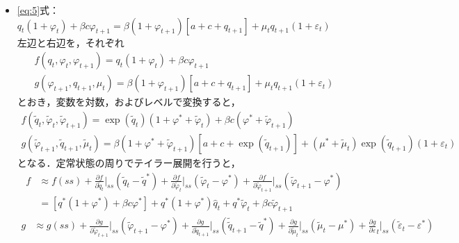 \documentclass[dvipdfmx]{jlreq}
\begin{document}
\begin{itemize}
  \item \eqref{eq:5}式：$q_t (1 + \varphi_t) + \beta c \varphi_{t+1} = \beta (1 + \varphi_{t+1})[a + c + q_{t+1}] + \mu_t q_{t+1} (1+\varepsilon_t)$ \\
    左辺と右辺を，それぞれ
    \begin{gather}
      f(q_t, \varphi_t, \varphi_{t+1}) = q_t (1 + \varphi_t) + \beta c \varphi_{t+1} \\
      g(\varphi_{t+1}, q_{t+1}, \mu_t) = \beta (1 + \varphi_{t+1})[a + c + q_{t+1}] + \mu_t q_{t+1} (1+\varepsilon_t)
    \end{gather}
    とおき，変数を対数，およびレベルで変換すると，
    \begin{gather}
      f(\widetilde{q}_t, \widetilde{\varphi}_t, \widetilde{\varphi}_{t+1}) = \exp(\widetilde{q}_t) (1 + \varphi^* + \widetilde{\varphi}_t) + \beta c (\varphi^* + \widetilde{\varphi}_{t+1}) \\
      g(\widetilde{\varphi}_{t+1}, \widetilde{q}_{t+1}, \widetilde{\mu}_t) = \beta(1 + \varphi^* + \widetilde{\varphi}_{t+1})[a + c + \exp(\widetilde{q}_{t+1})] + (\mu^* + \widetilde{\mu}_t) \exp(\widetilde{q}_{t+1}) (1+\varepsilon_t)
    \end{gather}
    となる．定常状態の周りでテイラー展開を行うと，
    \begin{equation}
      \begin{split}
        f &\approx f(ss) + \frac{\partial f}{\partial \widetilde{q}_t} \bigg|_{ss} (\widetilde{q}_t - \widetilde{q}^*) + \frac{\partial f}{\partial \widetilde{\varphi}_t} \bigg|_{ss} (\widetilde{\varphi}_t - \varphi^*) + \frac{\partial f}{\partial \widetilde{\varphi}_{t+1}} \bigg|_{ss} (\widetilde{\varphi}_{t+1} - \varphi^*) \\
        &= [q^*(1+\varphi^*) + \beta c \varphi^*] + q^*(1+\varphi^*) \widehat{q}_t + q^* \widetilde{\varphi}_t + \beta c \widetilde{\varphi}_{t+1}
      \end{split}
    \end{equation}
    \begin{equation}
      \begin{split}
        g &\approx g(ss) + \frac{\partial g}{\partial \widetilde{\varphi}_{t+1}} \bigg|_{ss} (\widetilde{\varphi}_{t+1} - \varphi^*) + \frac{\partial g}{\partial \widetilde{q}_{t+1}} \bigg|_{ss} (\widetilde{\widetilde{q}}_{t+1} - \widetilde{q}^*) + \frac{\partial g}{\partial \widetilde{\mu}_t} \bigg|_{ss} (\widetilde{\mu}_t - \mu^*) + \frac{\partial g}{\partial \varepsilon}_t \bigg|_{ss} (\widetilde{\varepsilon}_t - \varepsilon^*) \\

\end{split}
\end{equation}
\end{itemize}
\end{document}

